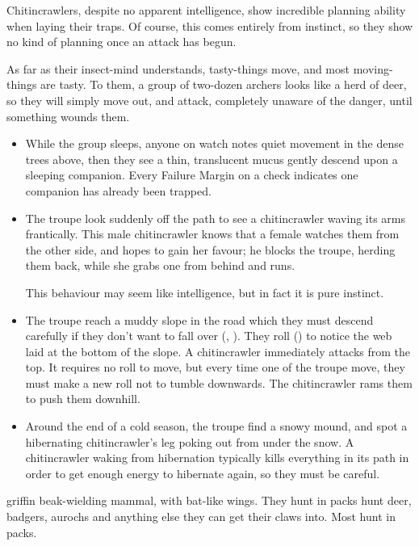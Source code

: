 \begin{multicols}{2}
\showEnc\label{chitin:tactics}
Chitincrawlers, despite no apparent intelligence, show incredible planning ability when laying their traps.
Of course, this comes entirely from instinct, so they show no kind of planning once an attack has begun.

As far as their insect-mind understands, tasty-things move, and most moving-things are tasty.
To them, a group of two-dozen archers looks like a herd of deer, so they will simply move out, and attack, completely unaware of the danger, until something wounds them.

\begin{itemize}
  \item
  While the group sleeps, anyone on watch notes quiet movement in the dense trees above, then they see a thin, translucent mucus gently descend upon a sleeping companion.
  Every Failure Margin on a  check indicates one companion has already been trapped.
  \item
  The troupe look suddenly off the path to see a chitincrawler waving its arms frantically.
  This male chitincrawler knows that a female watches them from the other side, and hopes to gain her favour; he blocks the troupe, herding them back, while she grabs one from behind and runs.

  This behaviour may seem like intelligence, but in fact it is pure instinct.
  \item
  The troupe reach a muddy slope in the road which they must descend carefully if they don't want to fall over (, \tn[7]).
  They roll  (\tn[8]) to notice the web laid at the bottom of the slope.
  A chitincrawler immediately attacks from the top.
  It requires no roll to move, but every time one of the troupe move, they must make a new roll not to tumble downwards.
  The chitincrawler rams them to push them downhill.
  \item
  Around the end of a cold season, the troupe find a snowy mound, and spot a hibernating chitincrawler's leg poking out from under the snow.
  A chitincrawler waking from hibernation typically kills everything in its path in order to get enough energy to hibernate again, so they must be careful.
\end{itemize}

  {griffin}%
  {beak-wielding mammal, with bat-like wings. They hunt in packs}%
hunt deer, badgers, aurochs and anything else they can get their claws into.
Most hunt in packs.


\end{multicols}
